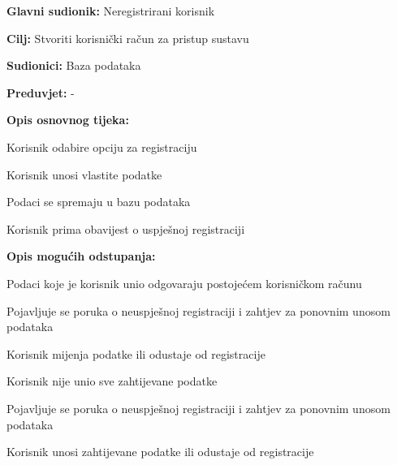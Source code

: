 					\noindent {}
					\begin{packed_item}
						
						\item \textbf{Glavni sudionik: }Neregistrirani korisnik 
						\item  \textbf{Cilj:} Stvoriti korisnički račun za pristup sustavu
						\item  \textbf{Sudionici:} Baza podataka
						\item  \textbf{Preduvjet:} -
						\item  \textbf{Opis osnovnog tijeka:}
						
						\item[] \begin{packed_enum}
							
							\item Korisnik odabire opciju za registraciju
							\item Korisnik unosi vlastite podatke
							\item Podaci se spremaju u bazu podataka
							\item Korisnik prima obavijest o uspješnoj registraciji
						\end{packed_enum}
						
						\item  \textbf{Opis mogućih odstupanja:}
						
						\item[] \begin{packed_item}
							
							\item[2.a] Podaci koje je korisnik unio odgovaraju postojećem korisničkom računu
							\item[] \begin{packed_enum}
								
								\item Pojavljuje se poruka o neuspješnoj registraciji i zahtjev za ponovnim unosom podataka
								\item Korisnik mijenja podatke ili odustaje od registracije
								
							\end{packed_enum}
							\item[2.b] Korisnik nije unio sve zahtijevane podatke
								\item[] \begin{packed_enum}
								
								\item Pojavljuje se poruka o neuspješnoj registraciji i zahtjev za ponovnim unosom podataka
								\item Korisnik unosi zahtijevane podatke ili odustaje od registracije
								
							\end{packed_enum}
							
						\end{packed_item}
					\end{packed_item}
					
